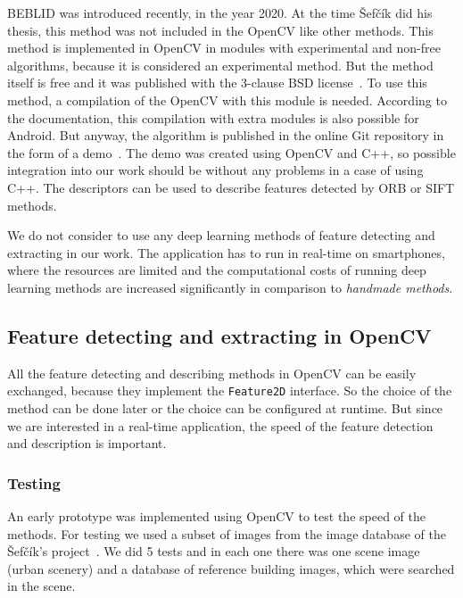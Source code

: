 \documentclass[thesis=B,english]{FITthesis}[2019/12/23]
\begin{document}
                BEBLID was introduced recently, in the year 2020. At the time Šefčík did his thesis, this method was not included in the OpenCV like other methods. This method is implemented in OpenCV in modules with experimental and non-free algorithms, because it is considered an experimental method. But the method itself is free and it was published with the 3-clause BSD license~\cite{Suarez2020_GitHub}. To use this method, a compilation of the OpenCV with this module is needed. According to the documentation, this compilation with extra modules is also possible for Android. But anyway, the algorithm is published in the online Git repository in the form of a demo~\cite{Suarez2020_GitHub}. The demo was created using OpenCV and C++, so possible integration into our work should be without any problems in a case of using C++. The descriptors can be used to describe features detected by ORB or SIFT methods.
                
                We do not consider to use any deep learning methods of feature detecting and extracting in our work. The application has to run in real-time on smartphones, where the resources are limited and the computational costs of running deep learning methods are increased significantly in comparison to \textit{handmade methods}\cite{SUAREZ2020_paper}.

            \subsection{Feature detecting and extracting in OpenCV}
                All the feature detecting and describing methods in OpenCV can be easily exchanged, because they implement the \texttt{Feature2D} interface. So the choice of the method can be done later or the choice can be configured at runtime. But since we are interested in a real-time application, the speed of the feature detection and description is important.
                
                \subsubsection*{Testing}
                An early prototype was implemented using OpenCV to test the speed of the methods. For testing we used a subset of images from the image database of the Šefčík's project~\cite{Sefcik2020}. We did 5 tests and in each one there was one scene image (urban scenery) and a database of reference building images, which were searched in the scene.
                
\end{document}
